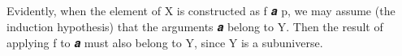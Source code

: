 \documentclass[a4paper,UKenglish,cleveref,autoref,thm-restate]{lipics-v2021}
\begin{document}
\begin{code}
\AgdaSpace{}%
\AgdaSpace{}%
\<%
\\
%
\>[2]\AgdaSpace{}%
\AgdaSpace{}%
\AgdaSymbol{=}\AgdaSpace{}%
\AgdaSpace{}%
\AgdaSpace{}%
\AgdaSpace{}%
\AgdaSpace{}%
\AgdaSpace{}%
\AgdaSymbol{(}\AgdaSpace{}%
\AgdaSymbol{)}\<%
\\
%
\\[\AgdaEmptyExtraSkip]%
%
\>[2]\AgdaSpace{}%
\AgdaSymbol{:}\AgdaSpace{}%
\AgdaSymbol{(}\AgdaSpace{}%
\AgdaSpace{}%
\AgdaSymbol{)}\AgdaSpace{}%
\AgdaSpace{}%
\AgdaSpace{}%
\<%
\\
%
\>[2]\AgdaSpace{}%
\AgdaSymbol{=}\AgdaSpace{}%
\AgdaSpace{}%
\AgdaSpace{}%
\AgdaSpace{}%
\<%
\end{code}
\ccpad
Evidently, when the element of  \ab X is constructed as  \ab f \ab 𝒂 \ab p, we may assume (the induction hypothesis) that the arguments \ab 𝒂 belong to \ab Y. Then the result of applying \ab f to \ab 𝒂 must also belong to \ab Y, since \ab Y is a subuniverse.
\end{document}
